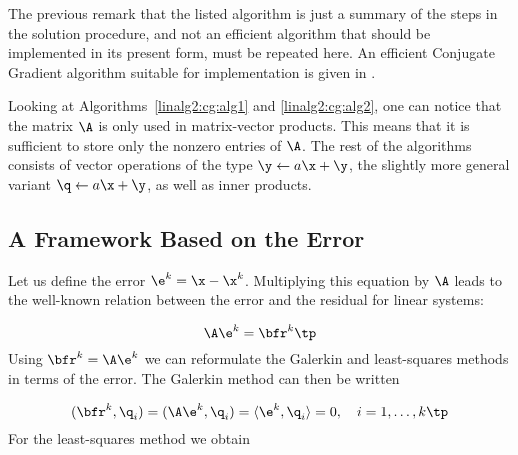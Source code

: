 
The previous remark that the listed algorithm is just a summary of the
steps in the solution procedure, and not an efficient algorithm
that should be implemented in its present form, must be repeated here. An
efficient Conjugate Gradient
algorithm suitable for implementation is given in
\cite[Ch.~2.3]{linalgtemplates93}.

Looking at Algorithms~\ref{linalg2:cg:alg1} and \ref{linalg2:cg:alg2},
one can notice that the matrix $\A$ is only used in matrix-vector
products. This means that it is sufficient
to store only the nonzero entries of $\A$.
The rest of the algorithms consists of vector operations of the
type $\y \leftarrow a\x + \y$,
the slightly more general variant $\q\leftarrow a\x +\y$, as well as
inner products.

\subsection{A Framework Based on the Error}
Let us define the error $\e^k = \x - \x^k$. Multiplying this equation by $\A$
leads to the well-known relation between the error and the residual
for linear systems:

\begin{equation}
\A\e^k = \bfr^k \tp
\label{linalg:erroreq}
\end{equation}
Using $\bfr^k = \A\e^k$ we can reformulate the Galerkin and least-squares
methods in terms of the error.
The Galerkin method can then be written

\begin{equation}
(\bfr^k,\q_i ) = (\A\e^k,\q_i) = \langle\e^k,\q_i\rangle = 0,\quad
i=1,\ldots,k\tp
\end{equation}
For the least-squares method we obtain

